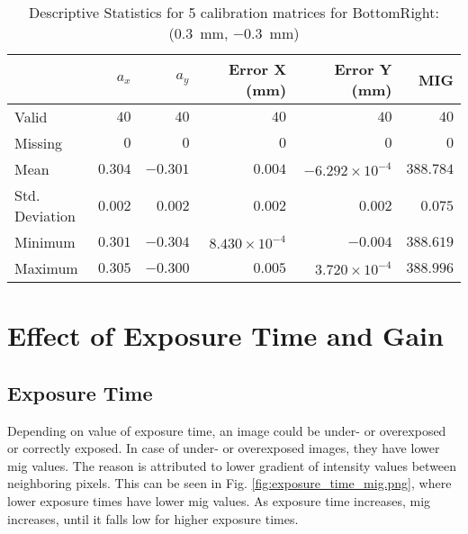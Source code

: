 \begin{table}[h]
    \begin{subtable}{\textwidth}
        \centering
        \footnotesize
        \begin{tabular}{lrrrrr}
            \toprule
                & $a_x$ & $a_y$ & Error X (mm) & Error Y (mm) & MIG  \\
            \midrule
			Valid & $40$ & $40$ & $40$ & $40$ & $40$  \\
			Missing & $0$ & $0$ & $0$ & $0$ & $0$  \\
			Mean & $0.304$ & $-0.301$ & $0.004$ & $-6.292\times10^{-4}$ & $388.784$  \\
			Std. Deviation & $0.002$ & $0.002$ & $0.002$ & $0.002$ & $0.075$  \\
			Minimum & $0.301$ & $-0.304$ & $8.430\times10^{-4}$ & $-0.004$ & $388.619$  \\
			Maximum & $0.305$ & $-0.300$ & $0.005$ & $3.720\times10^{-4}$ & $388.996$  \\
            \bottomrule
        \end{tabular}
        \caption{$T_{Avg}$}
        \end{subtable}

    \caption{Descriptive Statistics for 5 calibration matrices for \textsf{BottomRight:} (\SI{0.3}{\milli\meter}, \SI{-0.3}{\milli\meter})}
    \label{table:stats_matrix_bottomright}
\end{table}

\clearpage
\section{Effect of Exposure Time and Gain}
\subsection*{Exposure Time}
Depending on value of exposure time, an image could be under- or overexposed or correctly exposed. In case of under- or overexposed images, they have lower \gls{mig} values. The reason is attributed to lower gradient of intensity values between neighboring pixels. This can be seen in Fig. \ref{fig:exposure_time_mig.png}, where lower exposure times have lower \gls{mig} values. As exposure time increases, \gls{mig} increases, until it falls low for higher exposure times.

